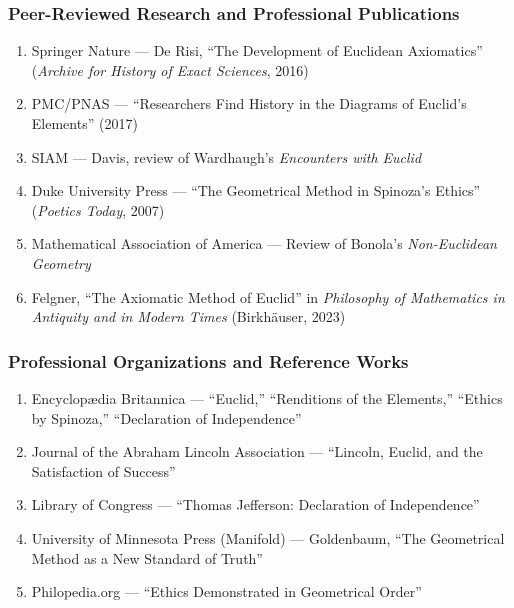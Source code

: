 \documentclass[11pt,letterpaper]{article}
\newcommand{\stageheader}[2]{%
  \noindent\colorbox{#2}{\makebox[\textwidth][l]{%
    \textcolor{white}{\bfseries\sffamily\hspace{6pt}#1\hspace{6pt}}}}%
  \vspace{0.5em}\par%
}
\begin{document}
\subsubsection{Peer-Reviewed Research and Professional Publications}

\begin{enumerate}[leftmargin=2em]
  \item Springer Nature --- De Risi, ``The Development of Euclidean Axiomatics'' (\textit{Archive for History of Exact Sciences}, 2016)
  \item PMC/PNAS --- ``Researchers Find History in the Diagrams of Euclid's Elements'' (2017)
  \item SIAM --- Davis, review of Wardhaugh's \textit{Encounters with Euclid}
  \item Duke University Press --- ``The Geometrical Method in Spinoza's Ethics'' (\textit{Poetics Today}, 2007)
  \item Mathematical Association of America --- Review of Bonola's \textit{Non-Euclidean Geometry}
  \item Felgner, ``The Axiomatic Method of Euclid'' in \textit{Philosophy of Mathematics in Antiquity and in Modern Times} (Birkh\"auser, 2023)
\end{enumerate}

\subsubsection{Professional Organizations and Reference Works}

\begin{enumerate}[leftmargin=2em]
  \item Encyclop\ae dia Britannica --- ``Euclid,'' ``Renditions of the Elements,'' ``Ethics by Spinoza,'' ``Declaration of Independence''
  \item Journal of the Abraham Lincoln Association --- ``Lincoln, Euclid, and the Satisfaction of Success''
  \item Library of Congress --- ``Thomas Jefferson: Declaration of Independence''
  \item University of Minnesota Press (Manifold) --- Goldenbaum, ``The Geometrical Method as a New Standard of Truth''
  \item Philopedia.org --- ``Ethics Demonstrated in Geometrical Order''
\end{enumerate}

\newpage

\stageheader{STAGE 3 --- MISSION PACKAGE}{tertiary}
\end{document}
